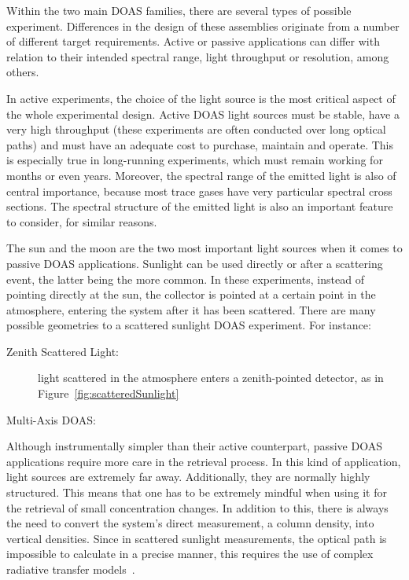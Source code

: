 Within the two main \gls{DOAS} families, there are several types of
possible experiment. Differences in the design of these assemblies
originate from a number of different target requirements. Active or
passive applications can differ with relation to their intended spectral
range, light throughput or resolution, among others.

In active experiments, the choice of the light source is the most
critical aspect of the whole experimental design. Active \gls{DOAS}
light sources must be stable, have a very high throughput (these
experiments are often conducted over long optical paths) and must have
an adequate cost to purchase, maintain and operate. This is especially
true in long-running experiments, which must remain working for months
or even years. Moreover, the spectral range of the emitted light is also
of central importance, because most trace gases have very particular
spectral cross sections. The spectral structure of the emitted light is
also an important feature to consider, for similar reasons.

The sun and the moon are the two most important light sources when it
comes to passive \gls{DOAS} applications. Sunlight can be used directly
or after a scattering event, the latter being the more common. In these
experiments, instead of pointing directly at the sun, the collector is
pointed at a certain point in the atmosphere, entering the system after
it has been scattered. There are many possible geometries to a scattered
sunlight \gls{DOAS} experiment. For instance:
\begin{description}
    \item[Zenith Scattered Light:] light scattered in the atmosphere
        enters a zenith-pointed detector, as in
        Figure~\ref{fig:scatteredSunlight}
    \item[Multi-Axis \gls{DOAS}:]

\end{description}

Although instrumentally simpler than their active counterpart, passive
\gls{DOAS} applications require more care in the retrieval process. In
this kind of application, light sources are extremely far away.
Additionally, they are normally highly structured. This means that one
has to be extremely mindful when using it for the retrieval of small
concentration changes. In addition to this, there is always the need to
convert the system's direct measurement, a column density, into vertical
densities. Since in scattered sunlight measurements, the optical path is
impossible to calculate in a precise manner, this requires the use of
complex radiative transfer models~\cite{Platt2007, Frins2006}.

